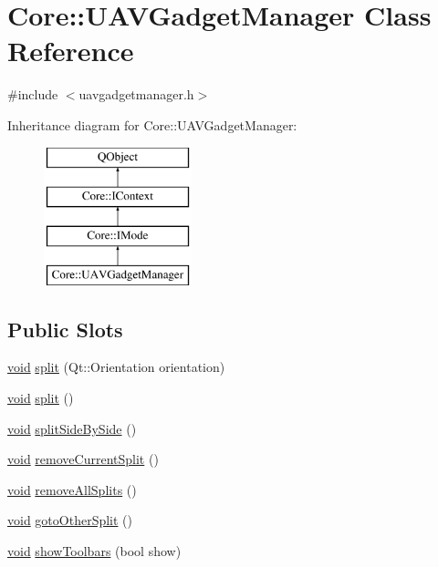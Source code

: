 \hypertarget{class_core_1_1_u_a_v_gadget_manager}{\section{Core\-:\-:U\-A\-V\-Gadget\-Manager Class Reference}
\label{class_core_1_1_u_a_v_gadget_manager}
}


{\ttfamily \#include $<$uavgadgetmanager.\-h$>$}

Inheritance diagram for Core\-:\-:U\-A\-V\-Gadget\-Manager\-:\begin{figure}[H]
\begin{center}
\leavevmode
\includegraphics[height=4.000000cm]{class_core_1_1_u_a_v_gadget_manager}
\end{center}
\end{figure}
\subsection*{Public Slots}
\begin{DoxyCompactItemize}
\item 
\hyperlink{group___u_a_v_objects_plugin_ga444cf2ff3f0ecbe028adce838d373f5c}{void} \hyperlink{group___core_plugin_gaeccb858176046a9efd6e76d0af690e6e}{split} (Qt\-::\-Orientation orientation)
\item 
\hyperlink{group___u_a_v_objects_plugin_ga444cf2ff3f0ecbe028adce838d373f5c}{void} \hyperlink{group___core_plugin_gabcf94b780cce894a494827a231c8cfa0}{split} ()
\item 
\hyperlink{group___u_a_v_objects_plugin_ga444cf2ff3f0ecbe028adce838d373f5c}{void} \hyperlink{group___core_plugin_ga65f8524b1999c58d5305b0f8c3cc84ee}{split\-Side\-By\-Side} ()
\item 
\hyperlink{group___u_a_v_objects_plugin_ga444cf2ff3f0ecbe028adce838d373f5c}{void} \hyperlink{group___core_plugin_ga189fbe44cfc2b4df765a10f7d37a83de}{remove\-Current\-Split} ()
\item 
\hyperlink{group___u_a_v_objects_plugin_ga444cf2ff3f0ecbe028adce838d373f5c}{void} \hyperlink{group___core_plugin_gac19293d686a36bafedf7bc2d0b27cb5f}{remove\-All\-Splits} ()
\item 
\hyperlink{group___u_a_v_objects_plugin_ga444cf2ff3f0ecbe028adce838d373f5c}{void} \hyperlink{group___core_plugin_gadc47479bc2f304826deef399d7c6d648}{goto\-Other\-Split} ()
\item 
\hyperlink{group___u_a_v_objects_plugin_ga444cf2ff3f0ecbe028adce838d373f5c}{void} \hyperlink{group___core_plugin_ga590e40dadf41f290707043f35457a196}{show\-Toolbars} (bool show)
\end{DoxyCompactItemize}
